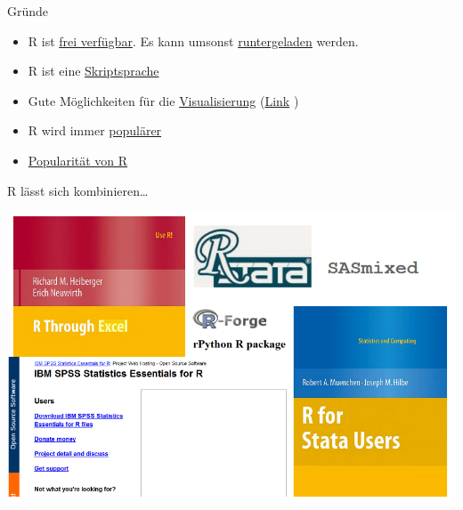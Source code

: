 \documentclass[
  ignorenonframetext,
]{beamer}
\providecommand{\tightlist}{%
  \setlength{\itemsep}{0pt}\setlength{\parskip}{0pt}}
\begin{document}
\begin{frame}{Gründe}
\protect\hypertarget{grunde}{}

\begin{itemize}
\tightlist
\item
  R ist \href{http://www.inside-r.org/why-use-r}{frei verfügbar}. Es
  kann umsonst \href{http://mirrors.softliste.de/cran/}{runtergeladen}
  werden.
\item
  R ist eine
  \href{https://de.wikipedia.org/wiki/Skriptsprache}{Skriptsprache}
\item
  Gute Möglichkeiten für die
  \href{http://research.stowers-institute.org/efg/R/}{Visualisierung}
  (\href{http://www.sr.bham.ac.uk/~ajrs/R/r-gallery.html}{Link} )
\item
  R wird immer
  \href{https://twitter.com/josiahjdavis/status/559778930476220418}{populärer}
\item
  \href{http://blog.revolutionanalytics.com/popularity/}{Popularität von
  R}
\end{itemize}

\end{frame}

\begin{frame}{R lässt sich kombinieren\ldots{}}
\protect\hypertarget{r-lasst-sich-kombinieren}{}

\includegraphics{figure/Rinterfaces.PNG}

\end{frame}
\end{document}
